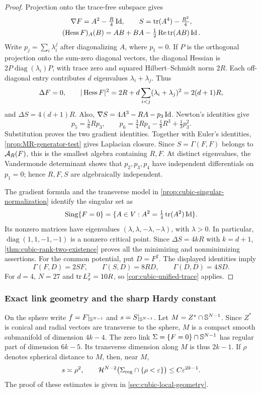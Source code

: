 \begin{proof}
Projection onto the trace-free subspace gives
\[
\begin{gathered}
 \nabla F=A^2-\tfrac R4\operatorname{Id},\qquad
 S=\operatorname{tr}(A^4)-\tfrac{R^2}{4},\\
 (\operatorname{Hess} F)_A(B)=AB+BA-\tfrac12\operatorname{Re}\operatorname{tr}(AB)\operatorname{Id}.
\end{gathered}
\]
Write \(p_j=\sum_i\lambda_i^j\) after diagonalizing \(A\), where
\(p_1=0\). If \(P\) is the orthogonal projection onto the
sum-zero diagonal vectors, the diagonal Hessian is
\(2P\operatorname{diag}(\lambda_i)P\), with trace zero and
squared Hilbert--Schmidt norm \(2R\). Each off-diagonal entry
contributes \(d\) eigenvalues \(\lambda_i+\lambda_j\). Thus
\[
 \Delta F=0,\qquad
 |\operatorname{Hess} F|^2=2R+d\sum_{i<j}(\lambda_i+\lambda_j)^2
             =2(d+1)R,
\]
and \(\Delta S=4(d+1)R\). Also,
\(\nabla S=4A^3-RA-p_3\operatorname{Id}\). Newton's identities give
\[
 p_5=\tfrac56Rp_3,\qquad
 p_6=\tfrac34Rp_4-\tfrac18R^3+\tfrac13p_3^2.
\]
Substitution proves the two gradient identities. Together with
Euler's identities, \cref{prop:MR-generator-test} gives Laplacian
closure. Since \(S=\Gamma(F,F)\) belongs to \(\mathcal A_R(F)\),
this is the smallest algebra containing \(R,F\).
At distinct eigenvalues, the Vandermonde determinant shows that
\(p_2,p_3,p_4\) have independent differentials on \(p_1=0\);
hence \(R,F,S\) are algebraically independent.

The gradient formula and the transverse model in
\cref{prop:cubic-singular-normalization} identify the singular set as
\[
 \operatorname{Sing}\{F=0\}
 =\{A\in V:A^2=\tfrac14\operatorname{tr}(A^2)\operatorname{Id}\}.
\]
Its nonzero matrices have eigenvalues \((\lambda,\lambda,-\lambda,-\lambda)\),
with \(\lambda>0\). In particular,
\(\operatorname{diag}(1,1,-1,-1)\) is a nonzero critical point.
Since \(\Delta S=4kR\) with \(k=d+1\),
\cref{thm:cubic-rank-two-existence} proves all the minimizing and
nonminimizing assertions. For the common potential, put \(D=F^2\).
The displayed identities imply
\[
 \Gamma(F,D)=2SF,\qquad\Gamma(S,D)=8RD,\qquad
 \Gamma(D,D)=4SD.
\]
For \(d=4\), \(N=27\) and \(\operatorname{tr} L_x^2=10R\), so
\cref{cor:cubic-unified-trace} applies.
\end{proof}

\subsubsection{Exact link geometry and the sharp Hardy constant}
On the sphere write \(f=F|_{\mathbb S^{N-1}}\) and
\(s=S|_{\mathbb S^{N-1}}\).
Let \(M=Z^*\cap \mathbb S^{N-1}\). Since \(Z^*\) is conical and radial
vectors are transverse to the sphere, \(M\) is a compact smooth
submanifold of dimension \(4k-4\). The zero link
\(\Sigma=\{F=0\}\cap \mathbb S^{N-1}\) has regular part of dimension \(6k-5\).
Its transverse dimension along \(M\) is thus \(2k-1\).
If \(\rho\) denotes spherical distance to \(M\), then, near \(M\),
\begin{equation}\label{eq:tube}
 s\asymp\rho^2,\qquad
 \mathcal H^{N-2}\bigl(\Sigma_{\mathrm{reg}}\cap\{\rho<\varepsilon\}\bigr)
 \leq C\varepsilon^{2k-1}.
\end{equation}
The proof of these estimates is given in \cref{sec:cubic-local-geometry}.

